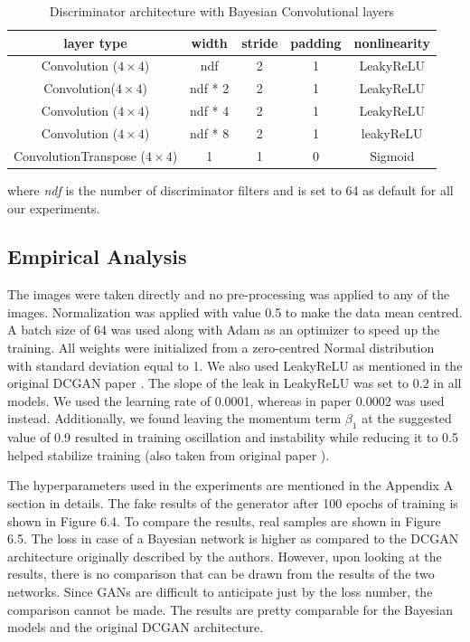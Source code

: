 \begin{table}[H]
    \centering
    \renewcommand{\arraystretch}{2}
    \begin{tabular}{c c c c c} 
 \hline
 layer type & width & stride & padding & nonlinearity \\ [0.5ex] 
 \hline
 Convolution ($4\times4$) & ndf & 2 & 1  & LeakyReLU \\ 
 

 Convolution($4\times4$) & ndf * 2 & 2 & 1  & LeakyReLU \\
 
 
 Convolution ($4\times4$) & ndf * 4 & 2 & 1 & LeakyReLU \\
 
 Convolution ($4\times4$) & ndf * 8 & 2 & 1  & leakyReLU \\
 
 ConvolutionTranspose ($4\times4$) & 1 & 1 & 0 & Sigmoid \\ [1ex] 
 \hline
\end{tabular}
\renewcommand{\arraystretch}{1}
\caption{Discriminator architecture with Bayesian Convolutional layers}
\label{tab:DiscriminatorArchitecture}
\end{table}

where \textit{ndf} is the number of discriminator filters and is set to 64 as default for all our experiments. 

\subsection{Empirical Analysis}

The images were taken directly and no pre-processing was applied to any of the images. Normalization was applied with value 0.5 to make the data mean centred. A batch size of 64 was used along with Adam \citep{kingma2014adam} as an optimizer to speed up the training. All weights were initialized from a zero-centred Normal distribution with standard deviation equal to 1. We also used LeakyReLU as mentioned in the original DCGAN paper \cite{DBLP:journals/corr/RadfordMC15}. The slope of the leak in LeakyReLU was set to 0.2 in all models. We used the learning rate of 0.0001, whereas in paper 0.0002 was used instead. Additionally, we found leaving the momentum term $\beta_1$ at the suggested value of 0.9 resulted in training oscillation and instability while reducing it to 0.5 helped stabilize training (also taken from original paper \cite{DBLP:journals/corr/RadfordMC15}).

The hyperparameters used in the experiments are mentioned in the Appendix A section in details.
The fake results of the generator after 100 epochs of training is shown in Figure 6.4. To compare the results, real samples are shown in Figure 6.5. The loss in case of a Bayesian network is higher as compared to the DCGAN architecture originally described by the authors. However, upon looking at the results, there is no comparison that can be drawn from the results of the two networks. Since GANs are difficult to anticipate just by the loss number, the comparison cannot be made. The results are pretty comparable for the Bayesian models and the original DCGAN architecture. 

